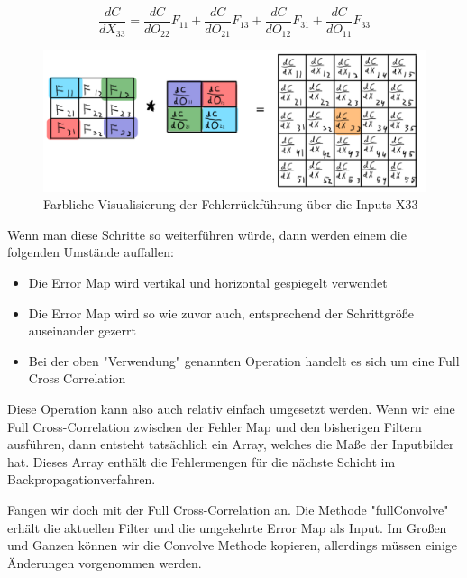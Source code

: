 \documentclass[12pt]{article}
\begin{document}
$$\frac {dC} {dX_{33}} = \frac {dC}{dO_{22}} F_{11} + \frac {dC}{dO_{21}} F_{13} + \frac {dC}{dO_{12}} F_{31} + \frac {dC}{dO_{11}} F_{33}$$

\begin{figure}[H]
\centering
\includegraphics[scale=0.27]{Images/017_BackProp_X33.png}
\caption{Farbliche Visualisierung der Fehlerrückführung über die Inputs X33}
\label{Farbliche Visualisierung der Fehlerrückführung über die Inputs X33}
\end{figure}

Wenn man diese Schritte so weiterführen würde, dann werden einem die folgenden Umstände auffallen:
\begin{itemize}
  \item Die Error Map wird vertikal und horizontal gespiegelt verwendet
  \item Die Error Map wird so wie zuvor auch, entsprechend der Schrittgröße auseinander gezerrt  
  \item Bei der oben "Verwendung" genannten Operation handelt es sich um eine Full Cross Correlation
\end{itemize}

Diese Operation kann also auch relativ einfach umgesetzt werden. Wenn wir eine Full Cross-Correlation zwischen der Fehler Map und den bisherigen Filtern ausführen, dann entsteht tatsächlich ein Array, welches die Maße der Inputbilder hat. Dieses Array enthält die Fehlermengen für die nächste Schicht im Backpropagationverfahren. 

Fangen wir doch mit der Full Cross-Correlation an. Die Methode "fullConvolve" erhält die aktuellen Filter und die umgekehrte Error Map als Input. Im Großen und Ganzen können wir die Convolve Methode kopieren, allerdings müssen einige Änderungen vorgenommen werden.
\end{document}
